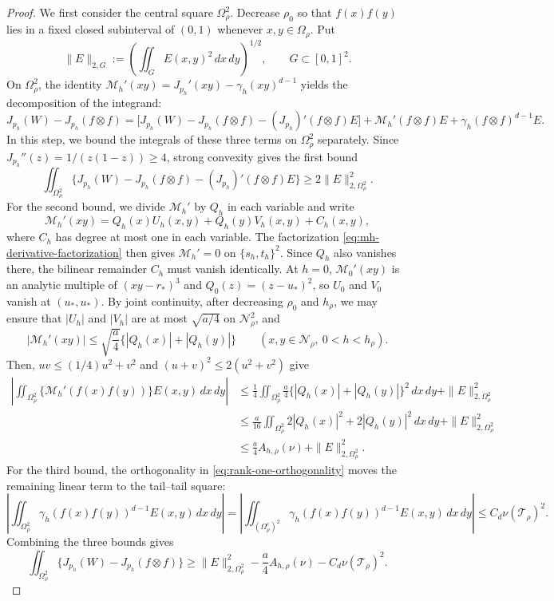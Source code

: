 \begin{proof}
We first consider the central square $\Omega_\rho^2$.  Decrease $\rho_0$ so
that $f(x)f(y)$ lies in a fixed closed subinterval of $(0,1)$ whenever
$x,y\in\Omega_\rho$.  Put
\[
  \|E\|_{2,G}
  :=\left( \iint_G E(x,y)^2\,dx\,dy \right)^{1/2},
  \qquad G \subset[0,1]^2.
\]
On $\Omega_\rho^2$, the identity $\mathcal M_h'(xy)=J_{p_h}'(xy)-\gamma_h(xy)^{d-1}$ yields
the decomposition of the integrand:
\begin{equation*}
  J_{p_h}(W)-J_{p_h}(f\otimes f)
  = \bigl[ J_{p_h}(W)-J_{p_h}(f\otimes f) -(J_{p_h})'(f\otimes f)E \bigr]
  +\mathcal M_h'(f\otimes f)E
      +\gamma_h(f\otimes f)^{d-1}E.
\end{equation*}
In this step, we bound the integrals of these three terms on $\Omega_\rho^2$ separately.
Since $J_{p_h}''(z)=1/(z(1-z))\ge4$, strong convexity gives the first bound
\[
  \iint_{\Omega_\rho^2}
  \{J_{p_h}(W)-J_{p_h}(f\otimes f)-(J_{p_h})'(f\otimes f)E\}
  \ge2\|E\|_{2,\Omega_\rho^2}^2.
\]
For the second bound, we divide $\mathcal M_h'$ by $Q_h$ in each variable and write
\[
  \mathcal M_h'(xy)=Q_h(x)U_h(x,y)+Q_h(y)V_h(x,y)+C_h(x,y),
\]
where $C_h$ has degree at most one in each variable.  The factorization
\eqref{eq:mh-derivative-factorization} then gives
$\mathcal M_h'=0$ on $\{s_h,t_h\}^2$.  Since $Q_h$ also vanishes there,
the bilinear remainder $C_h$ must vanish identically.
At $h=0$, $\mathcal M_0'(xy)$ is an analytic multiple of $(xy-r_*)^3$ and
$Q_0(z)=(z-u_*)^2$, so $U_0$ and $V_0$ vanish at $(u_*,u_*)$.  By
joint continuity, after decreasing $\rho_0$ and $h_\rho$, we may ensure that
$|U_h|$ and $|V_h|$ are at most $\sqrt{a/4}$ on $\mathcal N_\rho^2$, and
\[
  |\mathcal M_h'(xy)|
  \le\sqrt{\frac a4}
    \{|Q_h(x)|+|Q_h(y)|\}
  \qquad(x,y\in\mathcal N_\rho,\ 0<h<h_\rho).
\]
Then, $uv \le (1/4)u^2+v^2$ and
$(u+v)^2\le 2(u^2+v^2)$ give
\begin{align*}
  \left|\iint_{\Omega_\rho^2} \{\mathcal M_h'(f(x)f(y))\} E(x,y)\,dx\,dy\right|
  &\le \frac{1}{4} \iint_{\Omega_\rho^2} \frac{a}{4}\{|Q_h(x)|+|Q_h(y)|\}^2 \,dx\,dy + \|E\|_{2,\Omega_\rho^2}^2 \\
  &\le \frac{a}{16} \iint_{\Omega_\rho^2} 2|Q_h(x)|^2+2|Q_h(y)|^2 \,dx\,dy + \|E\|_{2,\Omega_\rho^2}^2 \\
  &\le \frac a4 A_{h,\rho}(\nu) + \|E\|_{2,\Omega_\rho^2}^2.
\end{align*}
For the third bound, the orthogonality in \eqref{eq:rank-one-orthogonality} moves
the remaining linear term to the tail--tail square:
\[
  \left| \iint_{\Omega_\rho^2}\gamma_h(f(x)f(y))^{d-1}E(x,y)\,dx\,dy \right|
  = \left| \iint_{(\Omega_\rho^c)^2}\gamma_h(f(x)f(y))^{d-1}E(x,y)\,dx\,dy \right|
  \le C_d \nu(\mathcal T_\rho)^2.
\]
Combining the three bounds gives
\begin{equation*}
  \iint_{\Omega_\rho^2} \{J_{p_h}(W)-J_{p_h}(f\otimes f)\}
  \ge \|E\|_{2,\Omega_\rho^2}^2 -\frac a4 A_{h,\rho}(\nu)-C_d\nu(\mathcal T_\rho)^2.
\end{equation*}


\end{proof}
